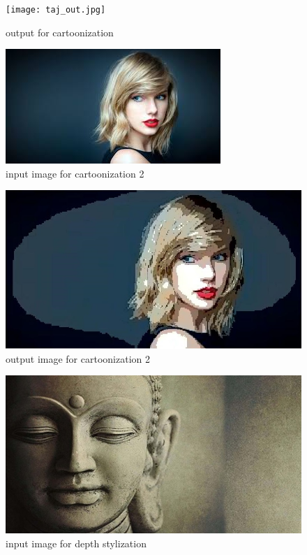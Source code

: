 \documentclass[conference]{IEEEtran}
\begin{document}
  \begin{figure}[h]
 	\texttt{[image: taj\_out.jpg]}
 	\caption{output for cartoonization}
 	\label{fig:outputCartoon}
 \end{figure}
 
  \begin{figure}[h]
 	\includegraphics[width = \linewidth]{taylor.jpg}
 	\caption{input image for cartoonization 2}
 	\label{fig:inputCartoon2}
 \end{figure}
 
   \begin{figure}[h]
 	\includegraphics[width = \linewidth]{taylor_out.jpg}
 	\caption{output image for cartoonization 2}
 	\label{fig:outputCartoon2}
 \end{figure}
 

\begin{figure}[h]
 	\includegraphics[width = \linewidth]{buddha.jpg}
 	\caption{input image for depth stylization}
 	\label{fig:inputDStylization}
 \end{figure}
\end{document}
